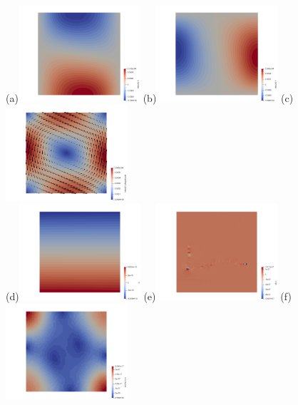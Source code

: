 \begin{center}
(a)\includegraphics[width=4.5cm]{python_codes/fieldstone_24/BA_104/u.png}
(b)\includegraphics[width=4.5cm]{python_codes/fieldstone_24/BA_104/v.png}
(c)\includegraphics[width=4.5cm]{python_codes/fieldstone_24/BA_104/vel.png}\\
(d)\includegraphics[width=4.5cm]{python_codes/fieldstone_24/BA_104/q.png}    
(e)\includegraphics[width=4.5cm]{python_codes/fieldstone_24/BA_104/divv.png}    
(f)\includegraphics[width=4.5cm]{python_codes/fieldstone_24/BA_104/e2.png}   \\

\end{center}
